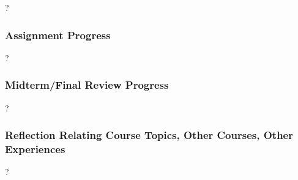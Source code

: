 \documentclass[12pt]{article}
\begin{document}
?

\subsubsection *{Assignment Progress}

?

\subsubsection *{Midterm/Final Review Progress}

?

\subsubsection *{Reflection Relating Course Topics, Other Courses, Other Experiences}

?

\end{document}
